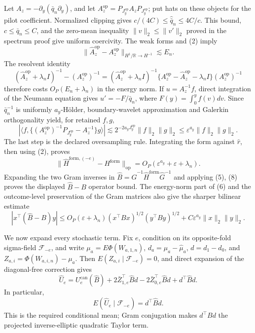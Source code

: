Let \(A_z=-\partial_y(\bar q_n\partial_y)\), and let \(A_z^{\mathrm{op}}=P_{J_y^{\mathrm{op}}}A_zP_{J_y^{\mathrm{op}}}\); put hats on these objects for the pilot coefficient. Normalized clipping gives \(c/(4C)\le\widehat{\bar q}_n\le4C/c\). This bound, \(c\le\bar q_n\le C\), and the zero-mean inequality \(\|v\|_2\le\|v'\|_2\) proved in the spectrum proof give uniform coercivity. The weak forms and (2) imply
\[
\|\widehat A_z^{\mathrm{op}}-A_z^{\mathrm{op}}\|_{H^1/\mathbb R\to H^{-1}}
\lesssim E_n.
\]
The resolvent identity
\[
(\widehat A_z^{\mathrm{op}}+\lambda_nI)^{-1}-(A_z^{\mathrm{op}})^{-1}
=(\widehat A_z^{\mathrm{op}}+\lambda_nI)^{-1}
\{A_z^{\mathrm{op}}-\widehat A_z^{\mathrm{op}}-\lambda_nI\}(A_z^{\mathrm{op}})^{-1} \tag{6}
\]
therefore costs \(O_P(E_n+\lambda_n)\) in the energy norm. If \(u=A_z^{-1}f\), direct integration of the Neumann equation gives \(u'=-F/\bar q_n\), where \(F(y)=\int_0^yf(v)dv\). Since \(\bar q_n^{-1}\) is uniformly \(a_y\)-H\"older, boundary-wavelet approximation and Galerkin orthogonality yield, for retained \(f,g\),
\[
|\langle f,\{(A_z^{\mathrm{op}})^{-1}P_{J_y^{\mathrm{op}}}-A_z^{-1}\}g\rangle|
\lesssim2^{-2a_yJ_y^{\mathrm{op}}}\|f\|_2\|g\|_2
\le\varepsilon^{a_y}\|f\|_2\|g\|_2.                              \tag{7}
\]
The last step is the declared oversampling rule. Integrating the form against \(\widehat r\), then using (2), proves
\[
\|\widehat H^{\mathrm{form},(-e)}-H^{\mathrm{form}}\|_{\mathrm{op}}
=O_P(\varepsilon^{a_y}+\varepsilon+\lambda_n).                        \tag{8}
\]
Expanding the two Gram inverses in \(\widehat B=\widehat G^{-1}\widehat H^{\mathrm{form}}\widehat G^{-1}\) and applying (5), (8) proves the displayed \(\widehat B-B\) operator bound. The energy-norm part of (6) and the outcome-level preservation of the Gram matrices also give the sharper bilinear estimate
\[
|x^\top(\widehat B-B)y|
\le O_P(\varepsilon+\lambda_n)(x^\top Bx)^{1/2}(y^\top By)^{1/2}
+C\varepsilon^{a_y}\|x\|_2\|y\|_2.                                \tag{9}
\]

We now expand every stochastic term. Fix \(e\), condition on its opposite-fold sigma-field \(\mathscr F_{-e}\), and write \(\mu_a=E\Phi(W_{a,1,n})\), \(d_a=\mu_a-\widehat\mu_a\), \(d=d_1-d_0\), and \(Z_{a,i}=\Phi(W_{a,i,n})-\mu_a\). Then \(E(Z_{a,i}\mid\mathscr F_{-e})=0\), and direct expansion of the diagonal-free correction gives
\[
\widehat U_e=U_e^{\mathrm{can}}(\widehat B)
+2\bar Z_{1,e}^\top\widehat Bd-2\bar Z_{0,e}^\top\widehat Bd+d^\top\widehat Bd. \tag{10}
\]
In particular,
\[
E(\widehat U_e\mid\mathscr F_{-e})=d^\top\widehat Bd.                \tag{11}
\]
This is the required conditional mean; Gram conjugation makes \(d^\top Bd\) the projected inverse-elliptic quadratic Taylor term.

